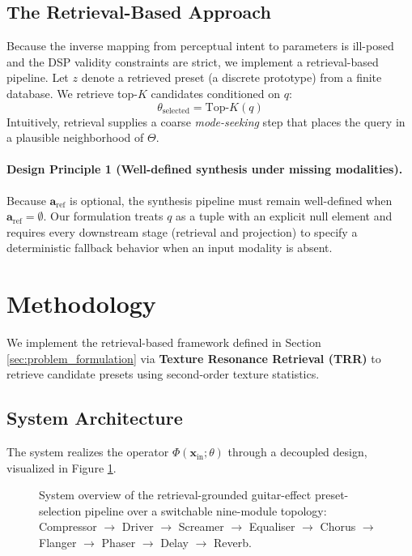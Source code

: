 \subsection{The Retrieval-Based Approach}
Because the inverse mapping from perceptual intent to parameters is ill-posed and the DSP validity constraints are strict, we implement a retrieval-based pipeline. Let $z$ denote a retrieved preset (a discrete prototype) from a finite database. We retrieve top-$K$ candidates conditioned on $q$:
\begin{equation}
	\theta_{\text{selected}} = \text{Top-}K(q)
\end{equation}
Intuitively, retrieval supplies a coarse \textit{mode-seeking} step that places the query in a plausible neighborhood of $\Theta$.
\paragraph{Design Principle 1 (Well-defined synthesis under missing modalities).}
Because $\mathbf{a}_{\text{ref}}$ is optional, the synthesis pipeline must remain well-defined when $\mathbf{a}_{\text{ref}}=\emptyset$. Our formulation treats $q$ as a tuple with an explicit null element and requires every downstream stage (retrieval and projection) to specify a deterministic fallback behavior when an input modality is absent.

\section{Methodology}
\label{sec:methodology}

We implement the retrieval-based framework defined in Section \ref{sec:problem_formulation} via \textbf{Texture Resonance Retrieval (TRR)} to retrieve candidate presets using second-order texture statistics.

\subsection{System Architecture}
\label{ssec:architecture}

The system realizes the operator $\Phi(\mathbf{x}_{\text{in}}; \theta)$ through a decoupled design, visualized in Figure \ref{fig:architecture}.

\begin{figure}[t]
\centering
\resizebox{\textwidth}{!}{}
\caption[System overview]{System overview of the retrieval-grounded guitar-effect preset-selection pipeline over a switchable nine-module topology: Compressor $\to$ Driver $\to$ Screamer $\to$ Equaliser $\to$ Chorus $\to$ Flanger $\to$ Phaser $\to$ Delay $\to$ Reverb.}
\label{fig:architecture}
\end{figure}


